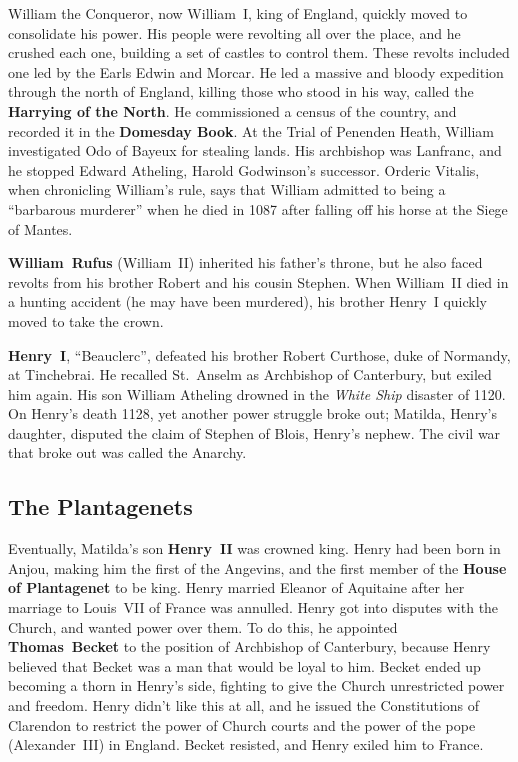 William the Conqueror, now William~I, king of England, quickly moved to consolidate his power.
His people were revolting all over the place, and he crushed each one,
building a set of castles to control them.
These revolts included one led by the Earls Edwin and Morcar.
He led a massive and bloody expedition through the north of England,
killing those who stood in his way, called the \textbf{Harrying of the North}.
He commissioned a census of the country, and recorded it in the \textbf{Domesday Book}.
At the Trial of Penenden Heath, William investigated Odo of Bayeux for stealing lands.
His archbishop was Lanfranc, and he stopped Edward Atheling, Harold Godwinson's successor.
Orderic Vitalis, when chronicling William's rule, says that William admitted to being a ``barbarous murderer''
when he died in 1087 after falling off his horse at the Siege of Mantes.

\textbf{William~Rufus} (William~II) inherited his father's throne,
but he also faced revolts from his brother Robert and his cousin Stephen.
When William~II died in a hunting accident (he may have been murdered),
his brother Henry~I quickly moved to take the crown.

\textbf{Henry~I}, ``Beauclerc'', defeated his brother Robert Curthose, duke of Normandy, at Tinchebrai.
He recalled St.\ Anselm as Archbishop of Canterbury, but exiled him again.
His son William Atheling drowned in the \textit{White Ship} disaster of 1120.
On Henry's death 1128, yet another power struggle broke out;
Matilda, Henry's daughter, disputed the claim of Stephen of Blois, Henry's nephew.
The civil war that broke out was called the Anarchy.

\subsection*{The Plantagenets}

Eventually, Matilda's son \textbf{Henry~II} was crowned king.
Henry had been born in Anjou, making him the first of the Angevins,
and the first member of the \textbf{House of Plantagenet} to be king.
Henry married Eleanor of Aquitaine after her marriage to Louis~VII of France was annulled.
Henry got into disputes with the Church, and wanted power over them.
To do this, he appointed \textbf{Thomas~Becket} to the position of Archbishop of Canterbury,
because Henry believed that Becket was a man that would be loyal to him.
Becket ended up becoming a thorn in Henry's side, fighting to give the Church unrestricted power and freedom.
Henry didn't like this at all,
and he issued the Constitutions of Clarendon to restrict the power of Church courts
and the power of the pope (Alexander~III) in England.
Becket resisted, and Henry exiled him to France.

